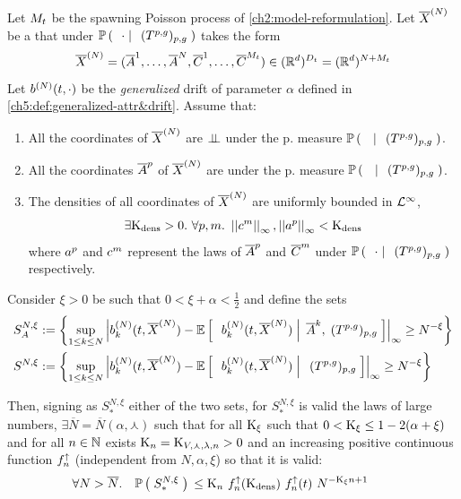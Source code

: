 \begin{proposition}\label{ch5:prop:LLN1}
	
	Let $M_t$ be the spawning Poisson process of \ref{ch2:model-reformulation}. Let $\overline{X}^{(N)}$ be a \rv that under $\mathbb{P} \left( \; \left. \; \cdot \; \right| \; \;(T^{p,g})_{p,g}  \; \right)$ takes the form
	\begin{equation}
		\overline{X}^{(N)} = (\overline{A}^1, \ldots, \overline{A}^N, \overline{C}^1, \ldots, \overline{C}^{M_t}) \in (\mathbb{R}^d)^{D_t} =  (\mathbb{R}^d)^{N + M_t} 
	\end{equation}
	Let $b^{(N)}(t, \cdot)$ be the \emph{generalized} drift of parameter $\alpha$ defined in \ref{ch5:def:generalized-attr&drift}.
	Assume that:
	\begin{enumerate}
		\item All the coordinates of $\overline{X}^{(N)}$ are $\perp \!\!\! \perp$ under the p. measure $\mathbb{P} \left( \; \left. \;  \; \right| \; \;(T^{p,g})_{p,g}  \; \right)$.
		\item All the coordinates $\overline{A}^p$ of $\overline{X}^{(N)}$ are \iid under the p. measure $\mathbb{P} \left( \; \left. \;  \; \right| \; \;(T^{p,g})_{p,g}  \; \right)$.
		\item The densities of all coordinates of $\overline{X}^{(N)}$ are uniformly bounded in $\mathcal{L}^{\infty}$, \ie
		\begin{equation*}
			\exists \text{K}_{\text{dens}}>0.\
			\forall p,m.\
			\left|\left| c^m \right|\right|_\infty, \left|\left| a^p \right|\right|_\infty < \text{K}_{\text{dens}}
		\end{equation*}
		where $a^p$ and $c^m$ represent the laws of $\overline{A}^p$ and $\overline{C}^m$ under $\mathbb{P} \left( \; \left. \; \cdot \; \right| \; \;(T^{p,g})_{p,g}  \; \right)$ respectively.
	\end{enumerate}
	Consider $\xi >0$ be such that $0<\xi + \alpha < \frac{1}{2}$ and define the sets
	\begin{equation*}
		\begin{aligned}
			S^{N,\xi}_A
			&:= \left\{ \sup_{1\leq k \leq N} 
			\left| 
				b_k^{(N)}(t, \overline{X}^{(N)}) 
				- \mathbb{E} \left[ \; \left. \; 
					b^{(N)}_k(t,\overline{X}^{(N)})
				 \; \right| \; \overline{A}^k,\;(T^{p,g})_{p,g} \; \right]
			 \right|_\infty \geq N^{-\xi} 
			\right\}
			\\
			S^{N, \xi}
			&:= \left\{ \sup_{1\leq k \leq N} 
			\left| 
				b_k^{(N)}(t, \overline{X}^{(N)}) 
				- \mathbb{E} \left[ \; \left. \; 
					b^{(N)}_k(t,\overline{X}^{(N)})
				 \; \right| \; \;(T^{p,g})_{p,g} \; \right]
			 \right|_\infty \geq N^{-\xi} 
			\right\}
		\end{aligned}
	\end{equation*}
	
	Then, signing as $S_\ast^{N, \xi}$ either of the two sets, for $S_\ast^{N, \xi}$ is valid the laws of large numbers, \ie $\exists \overline{N} = \overline{N}(\alpha, \curlywedge)$ such that for all $\text{K}_\xi$ such that $0 < \text{K}_\xi \leq 1 - 2(\alpha + \xi)$ and for all $n\in\mathbb{N}$ exists $\text{K}_n = \text{K}_{V, \curlywedge, \lambda, n}  >0$ and an increasing positive continuous function $f^\uparrow_n$ (independent from $N, \alpha,\xi$)  so that it is valid:
	\begin{align}
		& \forall N> \overline{N}.	&	&\mathbb{P} \left( \; S^{N,\xi}_\ast \; \right){}
		\leq 
			\text{K}_n\
			f^\uparrow_n(\text{K}_{\text{dens}})\
			f^\uparrow_n(t)\
			N^{-\text{K}_\xi n + 1}
		&& \label{ch5:LLN1:bound}
	\end{align}
\end{proposition}


